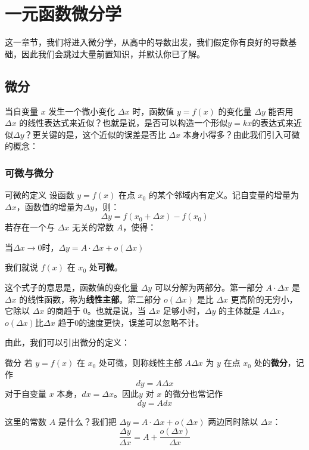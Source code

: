 \chapter{一元函数微分学}
这一章节，我们将进入微分学，从高中的导数出发，我们假定你有良好的导数基础，因此我们会跳过大量前置知识，并默认你已了解。


\section{微分}

当自变量 $x$ 发生一个微小变化 $\Delta x$ 时，函数值 $y = f(x)$ 的变化量 $\Delta y$ 能否用 $\Delta x$ 的线性表达式来近似？也就是说，是否可以构造一个形似$y=kx$的表达式来近似$\Delta y$？更关键的是，这个近似的误差是否比 $\Delta x$ 本身小得多？由此我们引入可微的概念：

\subsection{可微与微分}

\begin{definition}{可微的定义}{}
  设函数 $y = f(x)$ 在点 $x_0$ 的某个邻域内有定义。记自变量的增量为 $\Delta x$，函数值的增量为$\Delta y$，则：
  \[
  \Delta y = f(x_0 + \Delta x) - f(x_0)
  \]
  若存在一个与 $\Delta x$ 无关的常数 $A$，使得：
\begin{center}
    当$\Delta x \to 0$时，$\Delta y = A \cdot \Delta x + o(\Delta x)$
\end{center}
  我们就说 $f(x)$ 在 $x_0$ 处\textbf{可微}。
\end{definition}

这个式子的意思是，函数值的变化量 $\Delta y$ 可以分解为两部分。第一部分 $A \cdot \Delta x$ 是 $\Delta x$ 的线性函数，称为\textbf{线性主部}。第二部分 $o(\Delta x)$ 是比 $\Delta x$ 更高阶的无穷小，它除以 $\Delta x$ 的商趋于 $0$。也就是说，当 $\Delta x$ 足够小时，$\Delta y$ 的主体就是 $A \Delta x$，$o(\Delta x)$比$\Delta x$ 趋于$0$的速度更快，误差可以忽略不计。

由此，我们可以引出微分的定义：

\begin{definition}{微分}{}
若 $y=f(x)$ 在 $x_0$ 处可微，则称线性主部 $A \Delta x$ 为 $y$ 在点 $x_0$ 处的\textbf{微分}，记作
\[
dy = A \Delta x
\]
对于自变量 $x$ 本身，$dx = \Delta x$。因此$y$ 对 $x$ 的微分也常记作
\[
dy = A dx
\]
\end{definition}

这里的常数 $A$ 是什么？我们把 $\Delta y = A \cdot \Delta x + o(\Delta x)$ 两边同时除以 $\Delta x$：
\[
\frac{\Delta y}{\Delta x} = A + \frac{o(\Delta x)}{\Delta x}
\]

